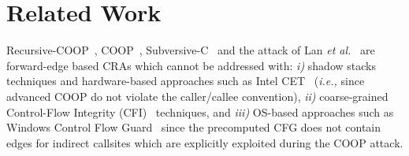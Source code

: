 \section{Related Work}
\label{chapter:Related_Work}

% 

Recursive-COOP~\cite{crane:readactor++}, COOP~\cite{schuster:coop}, Subversive-C~\cite{subversive-c:lettner} and the attack of Lan \textit{et al.}~\cite{loop:oriented} are forward-edge based CRAs which cannot be addressed with:
\textit{i)}  shadow stacks techniques and hardware-based approaches such as Intel CET~\cite{intel:cet} (\textit{i.e.,} since advanced COOP do not violate the caller/callee convention), 
\textit{ii)} coarse-grained Control-Flow Integrity (CFI)~\cite{abadi:cfi2, abadi:cfi} techniques, and 
\textit{iii)} OS-based approaches such as Windows Control Flow Guard~\cite{windows:cfguard} 
since the precomputed CFG does not contain edges for indirect callsites which are explicitly exploited during the COOP attack.


